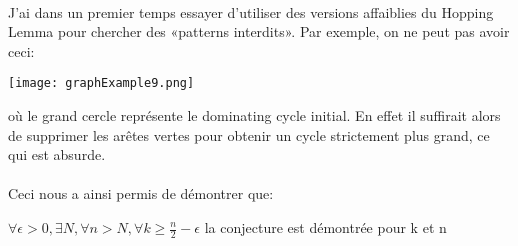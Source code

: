 \documentclass[a4paper]{article}
\theoremstyle{definition}
\theoremstyle{remark}
\begin{document}
\paragraph{}
J'ai dans un premier temps essayer d'utiliser des versions affaiblies du Hopping Lemma pour chercher des «patterns interdits». Par exemple, on ne peut pas avoir ceci:


\texttt{[image: graphExample9.png]}

où le grand cercle représente le dominating cycle initial. En effet il 
suffirait alors de supprimer les arêtes vertes pour obtenir un cycle strictement plus grand, ce qui est absurde.


\paragraph{}
Ceci nous a ainsi permis de démontrer que:

$\forall \epsilon > 0, \exists N, \forall n > N, \forall k \geq \frac{n}{2} - \epsilon$ la conjecture est démontrée pour k et n
\end{document}
